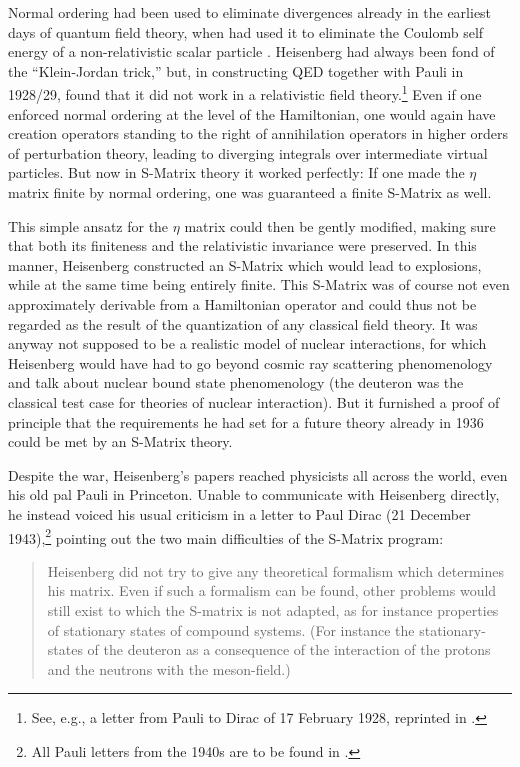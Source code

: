 \documentclass[12pt]{article}
\begin{document}
Normal ordering had been used to eliminate divergences already in the earliest days of quantum field theory, when \cite{jordan_1927_zum-mehrkorperproblem} had used it to eliminate the Coulomb self energy of a non-relativistic scalar particle . Heisenberg had always been fond of the ``Klein-Jordan trick,'' but, in constructing QED together with Pauli in 1928/29, found that it did not work in a relativistic field theory.\footnote{See, e.g., a letter from Pauli to Dirac of 17 February 1928, reprinted in \citep{hermann_1979_wissenschaftlicher}.} Even if one enforced normal ordering at the level of the Hamiltonian, one would again have creation operators standing to the right of annihilation operators in higher orders of perturbation theory, leading to diverging integrals over intermediate virtual particles. But now in S-Matrix theory it worked perfectly: If one made the $\eta$ matrix finite by normal ordering, one was guaranteed a finite S-Matrix as well.

This simple ansatz for the $\eta$ matrix could then be gently modified, making sure that both its finiteness and the relativistic invariance were preserved. In this manner, Heisenberg constructed an S-Matrix which would lead to explosions, while at the same time being entirely finite. This S-Matrix was of course not even approximately derivable from a Hamiltonian operator and could thus not be regarded as the result of the quantization of any classical field theory. It was anyway not supposed to be a realistic model of nuclear interactions, for which Heisenberg would have had to go beyond cosmic ray scattering phenomenology and talk about nuclear bound state phenomenology (the deuteron was the classical test case for theories of nuclear interaction). But it furnished a proof of principle that the requirements he had set for a future theory already in 1936 could be met by an S-Matrix theory.

Despite the war, Heisenberg's papers reached physicists all across the world, even his old  pal Pauli in Princeton. Unable to communicate with Heisenberg directly, he instead voiced his usual criticism in a letter to Paul Dirac (21 December 1943),\footnote{All Pauli letters from the 1940s are to be found in \citep{meyenn_1993_wissenschaftlicher}.} pointing out the two main difficulties of the S-Matrix program:

\begin{quote}
Heisenberg did not try to give any theoretical formalism which determines his matrix. Even if such a formalism can be found, other problems would still exist to which the S-matrix is not adapted, as for instance properties of stationary states of compound systems. (For instance the stationary-states of the deuteron as a consequence of the interaction of the protons and the neutrons with the meson-field.)
\end{quote}
\end{document}

